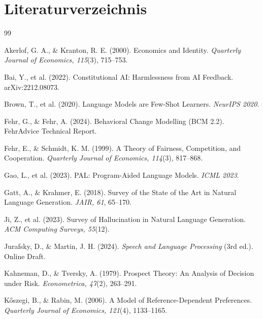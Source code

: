 \documentclass[12pt,a4paper]{article}
\begin{document}
\section*{Literaturverzeichnis}

\begin{thebibliography}{99}

Akerlof, G. A., \& Kranton, R. E. (2000). Economics and Identity. \textit{Quarterly Journal of Economics, 115}(3), 715--753.

Bai, Y., et al. (2022). Constitutional AI: Harmlessness from AI Feedback. arXiv:2212.08073.

Brown, T., et al. (2020). Language Models are Few-Shot Learners. \textit{NeurIPS 2020}.

Fehr, G., \& Fehr, A. (2024). Behavioral Change Modelling (BCM 2.2). FehrAdvice Technical Report.

Fehr, E., \& Schmidt, K. M. (1999). A Theory of Fairness, Competition, and Cooperation. \textit{Quarterly Journal of Economics, 114}(3), 817--868.

Gao, L., et al. (2023). PAL: Program-Aided Language Models. \textit{ICML 2023}.

Gatt, A., \& Krahmer, E. (2018). Survey of the State of the Art in Natural Language Generation. \textit{JAIR, 61}, 65--170.

Ji, Z., et al. (2023). Survey of Hallucination in Natural Language Generation. \textit{ACM Computing Surveys, 55}(12).

Jurafsky, D., \& Martin, J. H. (2024). \textit{Speech and Language Processing} (3rd ed.). Online Draft.

Kahneman, D., \& Tversky, A. (1979). Prospect Theory: An Analysis of Decision under Risk. \textit{Econometrica, 47}(2), 263--291.

K\H{o}szegi, B., \& Rabin, M. (2006). A Model of Reference-Dependent Preferences. \textit{Quarterly Journal of Economics, 121}(4), 1133--1165.


\end{thebibliography}
\end{document}
